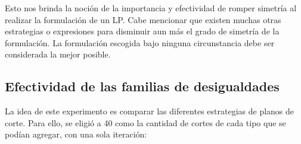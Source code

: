 Esto nos brinda la noción de la importancia y efectividad de romper simetría al realizar la formulación de un LP. Cabe mencionar que existen muchas otras estrategias o expresiones para disminuir aun más el grado de simetría de la formulación. La formulación escogida bajo ninguna circunstancia debe ser considerada la mejor posible.

\pagebreak

\subsection{Efectividad de las familias de desigualdades}

La idea de este experimento es comparar las diferentes estrategias de planos de corte. Para ello, se eligió a 40 como la cantidad de cortes de cada tipo que se podían agregar, con una sola iteración:

